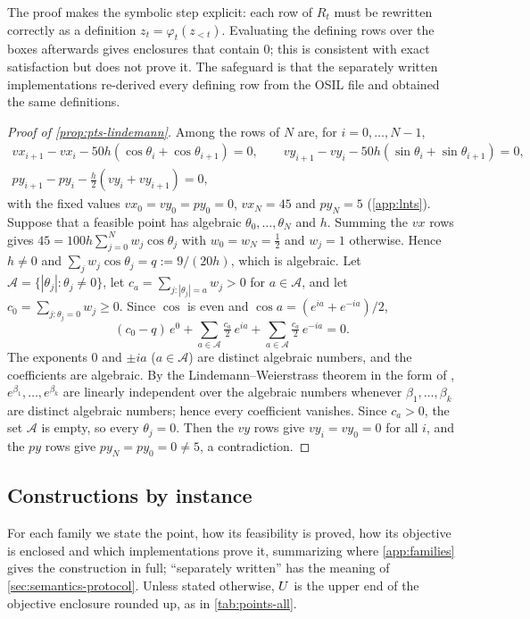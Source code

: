 The proof makes the symbolic step explicit: each row of $R_t$ must be rewritten correctly as a definition $z_t=\varphi_t(z_{<t})$.
Evaluating the defining rows over the boxes afterwards gives enclosures that contain $0$; this is consistent with exact satisfaction but does not prove it.
The safeguard is that the separately written implementations re-derived every defining row from the OSIL file and obtained the same definitions.

\begin{proof}[Proof of \cref{prop:pts-lindemann}]
Among the rows of $N$ are, for $i=0,\dots,N-1$,
\begin{gather*}
vx_{i+1}-vx_i-50h(\cos\theta_i+\cos\theta_{i+1})=0,\qquad
vy_{i+1}-vy_i-50h(\sin\theta_i+\sin\theta_{i+1})=0,\\
py_{i+1}-py_i-\tfrac h2(vy_i+vy_{i+1})=0,
\end{gather*}
with the fixed values $vx_0=vy_0=py_0=0$, $vx_N=45$ and $py_N=5$ (\cref{app:lnts}).
Suppose that a feasible point has algebraic $\theta_0,\dots,\theta_N$ and $h$.
Summing the $vx$ rows gives $45=100h\sum_{j=0}^{N}w_j\cos\theta_j$ with $w_0=w_N=\tfrac12$ and $w_j=1$ otherwise.
Hence $h\ne0$ and $\sum_jw_j\cos\theta_j=q:=9/(20h)$, which is algebraic.
Let $\mathcal{A}=\{|\theta_j|:\theta_j\ne0\}$, let $c_a=\sum_{j:|\theta_j|=a}w_j>0$ for $a\in\mathcal{A}$, and let $c_0=\sum_{j:\theta_j=0}w_j\ge0$.
Since $\cos$ is even and $\cos a=(e^{ia}+e^{-ia})/2$,
\[
(c_0-q)\,e^{0}+\sum_{a\in\mathcal{A}}\tfrac{c_a}{2}\,e^{ia}+\sum_{a\in\mathcal{A}}\tfrac{c_a}{2}\,e^{-ia}=0 .
\]
The exponents $0$ and $\pm ia$ ($a\in\mathcal{A}$) are distinct algebraic numbers, and the coefficients are algebraic.
By the Lindemann--Weierstrass theorem in the form of \citet[Chapter~1]{baker1975-transcendental-number-theory}, $e^{\beta_1},\dots,e^{\beta_k}$ are linearly independent over the algebraic numbers whenever $\beta_1,\dots,\beta_k$ are distinct algebraic numbers; hence every coefficient vanishes.
Since $c_a>0$, the set $\mathcal{A}$ is empty, so every $\theta_j=0$.
Then the $vy$ rows give $vy_i=vy_0=0$ for all $i$, and the $py$ rows give $py_N=py_0=0\ne5$, a contradiction.
\end{proof}

\subsection{Constructions by instance}\label{app:points-instances}

For each family we state the point, how its feasibility is proved, how its objective is enclosed and which implementations prove it, summarizing where \cref{app:families} gives the construction in full; ``separately written'' has the meaning of \cref{sec:semantics-protocol}.
Unless stated otherwise, $U$ is the upper end of the objective enclosure rounded up, as in \cref{tab:points-all}.

